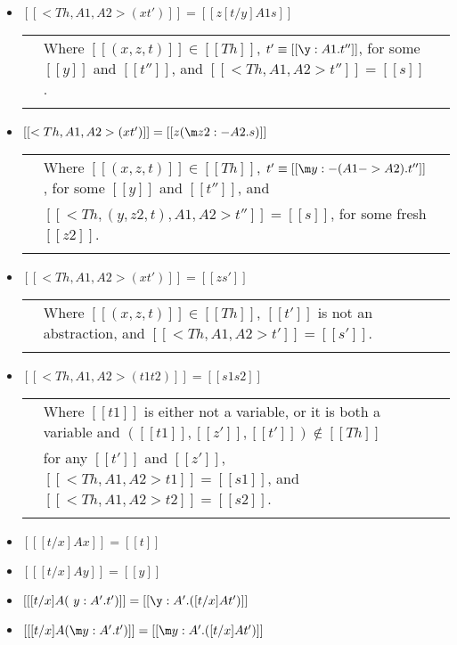 \begin{definition}
\begin{itemize}
  \item[] $[[<Th,A1,A2>(x t')]] = [[z [t/y] A1 s]]$\\
    \begin{tabular}{lll}
      & Where $[[(x,z,t)]] \in [[Th]]$, $t' \equiv [[\y:A1.t'']]$, for some $[[y]]$ and
      $[[t'']]$, and $[[<Th,A1,A2>t'']] = [[s]]$.\\
      & \\
    \end{tabular}
  \item[] $[[<Th,A1,A2>(x t')]] = [[z (\m z2:{-A2}.s)]]$\\
    \begin{tabular}{lll}
      & Where $[[(x,z,t)]] \in [[Th]]$, $t' \equiv [[\m y:{-(A1 -> A2)}.t'']]$, for some $[[y]]$ and $[[t'']]$, and \\
      & $[[<Th,(y,z2,t),A1,A2>t'']] = [[s]]$, for some fresh $[[z2]]$.\\
      & \\
    \end{tabular}
  \item[] $[[<Th,A1,A2>(x t')]] = [[z s']]$\\
    \begin{tabular}{lll}
      & Where $[[(x,z,t)]] \in [[Th]]$, $[[t']]$ is not an abstraction, and $[[<Th,A1,A2>t']] = [[s']]$.\\
      & \\
    \end{tabular}
  \item[] $[[<Th,A1,A2>(t1 t2)]] = [[s1 s2]]$\\
    \begin{tabular}{lll}
      & Where $[[t1]]$ is either not a variable, or it is both a variable
      and $([[t1]],[[z']],[[t']]) \not \in [[Th]]$ \\
      & for any $[[t']]$ and $[[z']]$, $[[<Th,A1,A2>t1]] = [[s1]]$, and $[[<Th,A1,A2>t2]] = [[s2]]$.\\
      & \\
    \end{tabular}

  \item[] $[[ [t/x] A x]] = [[t]]$
  \item[] $[[ [t/x] A y]] = [[y]]$

  \item[] $[[ [t/x] A (\ y:A'.t')]] = [[\y:A'.([t/x ] A t')]]$
  \item[] $[[ [t/x] A (\m y:A'.t')]] = [[\m y:A'.([t/x] A t')]]$


\end{itemize}
\end{definition}
